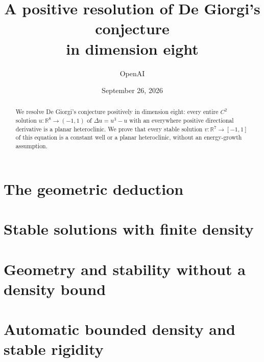 \documentclass[11pt]{article}
\title{A positive resolution of De Giorgi's conjecture\\in dimension eight}
\author{OpenAI}
\date{September 26, 2026}
\newcommand{\R}{\mathbb R}
\theoremstyle{definition}
\theoremstyle{remark}
\numberwithin{equation}{section}
\begin{document}
\maketitle
\begin{abstract}
We resolve De Giorgi's conjecture positively in dimension eight:
every entire $C^2$ solution $u:\R^8\to(-1,1)$ of
$\Delta u=u^3-u$ with an everywhere positive directional derivative
is a planar heteroclinic. We prove that every stable solution
$v:\R^7\to[-1,1]$ of this equation is a constant well or a planar heteroclinic,
without an energy-growth assumption.
\end{abstract}

\setcounter{tocdepth}{1}
\begingroup
\small
\tableofcontents
\endgroup

\part{The geometric deduction}

\part{Stable solutions with finite density}



\part{Geometry and stability without a density bound}



\part{Automatic bounded density and stable rigidity}

\appendix



\end{document}
